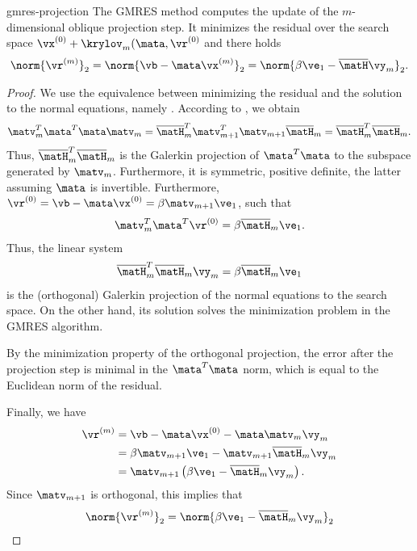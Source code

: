 \begin{Theorem}{gmres-projection}
  The GMRES method computes the update of the $m$-dimensional oblique
  projection step. It minimizes the residual over the search space
  $\vx^{(0)} +\krylov_m(\mata,\vr^{(0)}$ and there holds
  \begin{gather}
    \label{eq:gmres-norm}
    \norm{\vr^{(m)}}_2 = \norm{\vb-\mata\vx^{(m)}}_2 =
    \norm{\beta\ve_1 - \overline\matH \vy_m}_2.
  \end{gather}
\end{Theorem}

\begin{proof}
  We use the equivalence between minimizing the residual and the
  solution to the normal equations, namely
  . According to
  , we obtain
  \begin{gather}
    \matv_m^T\mata^T\mata\matv_m
    = \overline\matH_m^T \matv_{m+1}^T\matv_{m+1}\overline\matH_m
    = \overline\matH_m^T\overline\matH_m.
  \end{gather}
  Thus, $\overline\matH_m^T\overline\matH_m$ is the Galerkin
  projection of $\mata^T\mata$ to the subspace generated by
  $\matv_m$. Furthermore, it is symmetric, positive definite, the
  latter assuming $\mata$ is invertible.  Furthermore,
  $\vr^{(0)} = \vb-\mata\vx^{(0)} = \beta\matv_{m+1}\ve_1$, such that
  \begin{gather}
    \matv_m^T\mata^T\vr^{(0)} = \beta\overline\matH_m \ve_1.
  \end{gather}
  Thus, the linear system
  \begin{gather}
    \overline\matH_m^T\overline\matH_m \vy_m = \beta\overline\matH_m \ve_1
  \end{gather}
  is the (orthogonal) Galerkin projection of the normal equations to
  the search space. On the other hand, its solution solves the
  minimization problem in the GMRES algorithm.

  By the minimization property of the orthogonal projection, the error
  after the projection step is minimal in the $\mata^T\mata$ norm,
  which is equal to the Euclidean norm of the residual.

  Finally, we have
  \begin{align}
    \vr^{(m)}
    &= \vb-\mata\vx^{(0)} - \mata\matv_m\vy_m\\
    &=\beta\matv_{m+1}\ve_1 - \matv_{m+1}\overline\matH_m\vy_m\\
    &= \matv_{m+1}\left(\beta\ve_1 - \overline\matH_m\vy_m\right).
  \end{align}
  Since $\matv_{m+1}$ is orthogonal, this implies that
  \begin{gather}
    \norm{\vr^{(m)}}_2 = \norm{\beta\ve_1 - \overline\matH_m\vy_m}_2
  \end{gather}
\end{proof}

